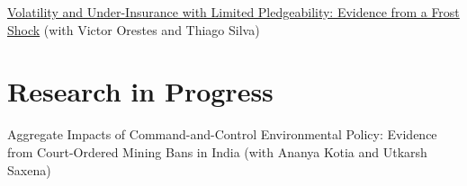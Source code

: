 \documentclass[12pt, a4paper]{article}
\begin{document}
{\color{oxfordblue}
\noindent \href{https://henryhzhang.com/files/Frost_Shock.pdf}{Volatility and Under-Insurance with Limited Pledgeability: Evidence from a Frost Shock}
} 
(with Victor Orestes and Thiago Silva) 


\section*{Research in Progress}
\noindent Aggregate Impacts of Command-and-Control Environmental Policy: Evidence from Court-Ordered Mining Bans in India (with Ananya Kotia and Utkarsh Saxena) %
\end{document}
